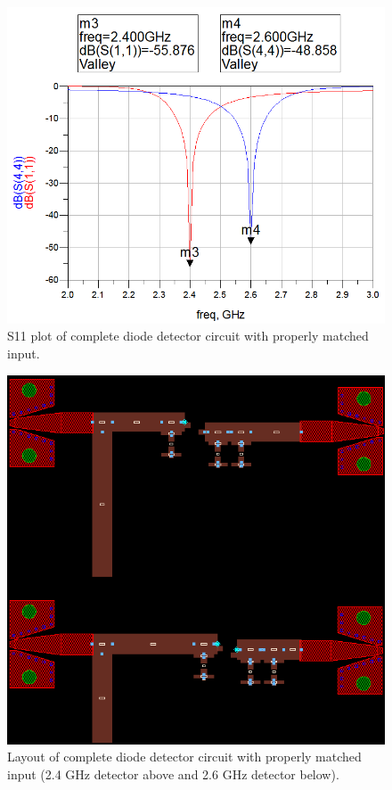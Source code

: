 \documentclass[conference]{IEEEtran}
\begin{document}
\begin{figure}[!htb]
\centering
\includegraphics[scale=0.4]{diode-pics/diodedetectorS11matched-final.png}
\caption{S11 plot of complete diode detector circuit with properly matched input.}
\label{fig:FinalDDS11}
\end{figure}

\begin{figure}[!htb]
\centering
\includegraphics[scale=0.45]{diode-pics/diodedetectorlayout.png}
\caption{Layout of complete diode detector circuit with properly matched input (2.4 GHz detector above and 2.6 GHz detector below).}
\label{fig:FinalDDLayout}
\end{figure}
\end{document}
